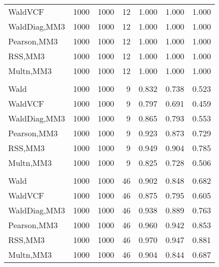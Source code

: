 \documentclass[
]{article}
\begin{document}
\begin{table}[H]
{\begin{tabular}[t]{lrrrrrr}
\hspace{1em}WaldVCF & 1000 & 1000 & 12 & 1.000 & 1.000 & 1.000\\
\hspace{1em}WaldDiag,MM3 & 1000 & 1000 & 12 & 1.000 & 1.000 & 1.000\\
\hspace{1em}Pearson,MM3 & 1000 & 1000 & 12 & 1.000 & 1.000 & 1.000\\
\hspace{1em}RSS,MM3 & 1000 & 1000 & 12 & 1.000 & 1.000 & 1.000\\
\hspace{1em}Multn,MM3 & 1000 & 1000 & 12 & 1.000 & 1.000 & 1.000\\
\addlinespace[0.3em]
\multicolumn{7}{l}{\textbf{2F 10V}}\\
\hspace{1em}Wald & 1000 & 1000 & 9 & 0.832 & 0.738 & 0.523\\
\hspace{1em}WaldVCF & 1000 & 1000 & 9 & 0.797 & 0.691 & 0.459\\
\hspace{1em}WaldDiag,MM3 & 1000 & 1000 & 9 & 0.865 & 0.793 & 0.553\\
\hspace{1em}Pearson,MM3 & 1000 & 1000 & 9 & 0.923 & 0.873 & 0.729\\
\hspace{1em}RSS,MM3 & 1000 & 1000 & 9 & 0.949 & 0.904 & 0.785\\
\hspace{1em}Multn,MM3 & 1000 & 1000 & 9 & 0.825 & 0.728 & 0.506\\
\addlinespace[0.3em]
\multicolumn{7}{l}{\textbf{3F 15V}}\\
\hspace{1em}Wald & 1000 & 1000 & 46 & 0.902 & 0.848 & 0.682\\
\hspace{1em}WaldVCF & 1000 & 1000 & 46 & 0.875 & 0.795 & 0.605\\
\hspace{1em}WaldDiag,MM3 & 1000 & 1000 & 46 & 0.938 & 0.889 & 0.763\\
\hspace{1em}Pearson,MM3 & 1000 & 1000 & 46 & 0.960 & 0.942 & 0.853\\
\hspace{1em}RSS,MM3 & 1000 & 1000 & 46 & 0.970 & 0.947 & 0.881\\
\hspace{1em}Multn,MM3 & 1000 & 1000 & 46 & 0.904 & 0.844 & 0.687\\
\bottomrule
\end{tabular}}
\endgroup{}
\end{table}
\end{document}
